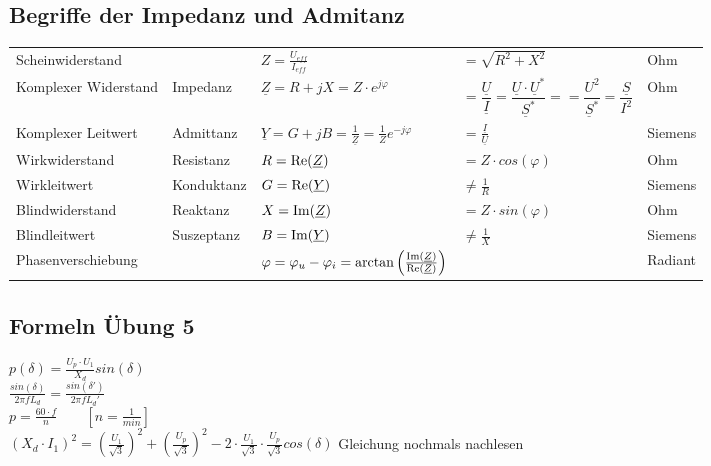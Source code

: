 	\subsection{Begriffe der Impedanz und Admitanz}
	\begin{tabular}{lllll}
		Scheinwiderstand & & $Z = \frac{U_{eff}}{I_{eff}} $ & $ =
		\sqrt{R^2+X^2}$ & Ohm\\ Komplexer Widerstand & Impedanz & $\underline Z = R + jX = Z \cdot e^{j \varphi}$ 
		& $  = \dfrac{\underline{U}}{\underline{I}} = \dfrac{\underline{U}\cdot\underline{U}^{\ast}}{\underline{S}^*} =  = \dfrac{U^2}{\underline{S}^*} = 
		\dfrac{\underline{S}}{I^2}$ & Ohm\\
		Komplexer Leitwert & Admittanz & $\underline Y = G + jB =
		\frac{1}{\underline Z} = \frac{1}{Z}e^{-j\varphi}$ & $= \frac{\underline{I}}{\underline{U}}$ &  Siemens\\
		Wirkwiderstand & Resistanz & $R = \operatorname{Re}(\underline Z) $ & $ = Z
		\cdot cos(\varphi)$ & Ohm\\
		Wirkleitwert & Konduktanz & $G = \operatorname{Re}(\underline Y) $ & $ \neq \frac{1}{R}$ &
		Siemens\\
		Blindwiderstand & Reaktanz & $X = \operatorname{Im}(\underline Z) $ & $ = Z
		\cdot sin(\varphi)$ & Ohm\\
		Blindleitwert & Suszeptanz & $B = \operatorname{Im}( \underline Y) $ & $ \neq \frac{1}{X}$
		& Siemens\\
		Phasenverschiebung & & $\varphi = \varphi_u - \varphi_i =
		\arctan\left(\frac{\operatorname{Im}(\underline{Z})}{\operatorname{Re}(\underline{Z})}\right)$ & &
		Radiant\\
		
	\end{tabular}
		
	\subsection{Formeln Übung 5}
	
	$ p(\delta)=\frac{U_p \cdot U_1}{X_d} sin(\delta) $
	\\
	$ \frac{sin(\delta)}{2\pi f L_d}=\frac{sin(\delta ')}{2\pi f L_d '} $
	\\
	$ p=\frac{60 \cdot f}{n} \qquad \left[n= \frac{1}{min}\right] $
	\\
	$ (X_d \cdot I_1)^2=(\frac{U_1}{\sqrt{3}})^2+(\frac{U_p}{\sqrt{3}})^2 - 2\cdot \frac{U_1}{\sqrt{3}}\cdot \frac{U_p}{\sqrt{3}} cos(\delta) $ Gleichung nochmals nachlesen
	